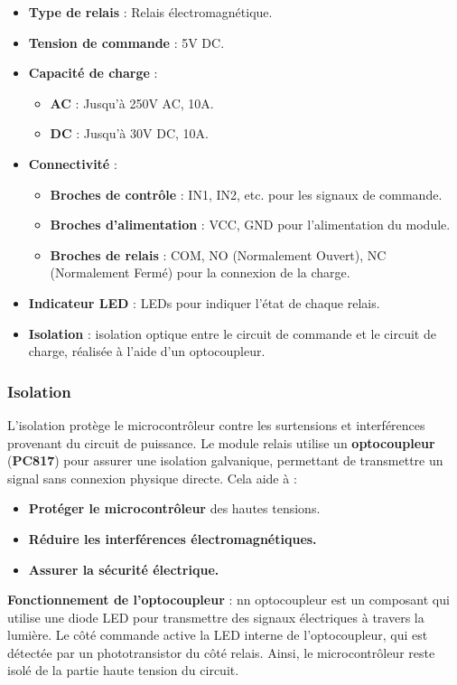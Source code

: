 \begin{itemize}[label={--}]
	\item \textbf{Type de relais} : Relais électromagnétique.
	\item \textbf{Tension de commande} : 5V DC.
	\item \textbf{Capacité de charge} : 
	\begin{itemize}[label={*}]
		\item \textbf{AC} : Jusqu'à 250V AC, 10A.
		\item \textbf{DC} : Jusqu'à 30V DC, 10A.
	\end{itemize}
	\item \textbf{Connectivité} :
	\begin{itemize}[label={*}]
		\item \textbf{Broches de contrôle} : IN1, IN2, etc. pour les signaux de commande.
		\item \textbf{Broches d'alimentation} : VCC, GND pour l'alimentation du module.
		\item \textbf{Broches de relais} : COM, NO (Normalement Ouvert), NC (Normalement Fermé) pour la connexion de la charge.
	\end{itemize}
	\item \textbf{Indicateur LED} : LEDs pour indiquer l'état de chaque relais.
	\item \textbf{Isolation} : isolation optique entre le circuit de commande et le circuit de charge, réalisée à l'aide d'un optocoupleur.
\end{itemize}

\subsubsection*{Isolation}
L'isolation protège le microcontrôleur contre les surtensions et interférences provenant du circuit de puissance. Le module relais utilise un \textbf{optocoupleur} (\textbf{PC817}) pour assurer une isolation galvanique, permettant de transmettre un signal sans connexion physique directe. Cela aide à :
\begin{itemize}[label={*}]
	\item \textbf{Protéger le microcontrôleur} des hautes tensions.
	\item \textbf{Réduire les interférences électromagnétiques.}
	\item \textbf{Assurer la sécurité électrique.}
\end{itemize}

\textbf{Fonctionnement de l'optocoupleur} : 
nn optocoupleur est un composant qui utilise une diode LED pour transmettre des signaux électriques à travers la lumière. Le côté commande active la LED interne de l'optocoupleur, qui est détectée par un phototransistor du côté relais. Ainsi, le microcontrôleur reste isolé de la partie haute tension du circuit.

